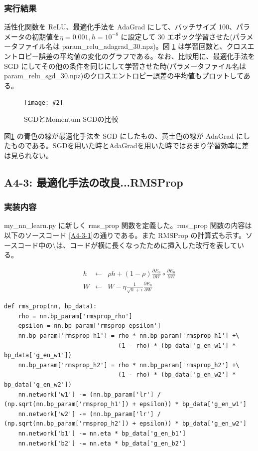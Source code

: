 \documentclass[a4paper,dvipdfmx]{jsarticle}
\newcommand{\image}[3]{
    \begin{figure}[H]
        \begin{center}
        \texttt{[image: \#2]}
        \end{center}
        \caption{#1}
        \label{#3}
    \end{figure}
}
\begin{document}
\subsubsection*{実行結果}

活性化関数を ReLU、最適化手法を AdaGrad にして、バッチサイズ 100、パラメータの初期値を$\eta = 0.001, h = 10^{-8}$ に設定して 30 エポック学習させた(パラメータファイル名は param\_relu\_adagrad\_30.npz)。図 \ref{fig-A4-2-1} は学習回数と、クロスエントロピー誤差の平均値の変化のグラフである。なお、比較用に、最適化手法を SGD にしてその他の条件を同じにして学習させた時(パラメータファイル名は param\_relu\_sgd\_30.npz)のクロスエントロピー誤差の平均値もプロットしてある。

\image{SGDとMomentum SGDの比較}{report_a4-2.png}{fig-A4-2-1}

図\ref{fig-A4-2-1} の青色の線が最適化手法を SGD にしたもの、黄土色の線が AdaGrad にしたものである。SGDを用いた時とAdaGradを用いた時ではあまり学習効率に差は見られない。

\subsection*{A4-3: 最適化手法の改良...RMSProp}

\subsubsection*{実装内容}
my\_nn\_learn.py に新しく rms\_prop 関数を定義した。rms\_prop 関数の内容は以下のソースコード \ref{A4-3-1}の通りである。また RMSProp の計算式も示す。ソースコード中の\textbackslash は、コードが横に長くなったために挿入した改行を表している。

 \begin{eqnarray}
  \label{rmsprop1}
 h & \leftarrow & \rho h + (1-\rho)\frac{\partial E_n}{\partial W} \circ \frac{\partial E_n}{\partial W} \\
 \label{rmsprop2}
 W & \leftarrow & W - \eta \frac{1}{\sqrt{h} + \epsilon} \frac{\partial E_n}{\partial W}
 \end{eqnarray}
\begin{lstlisting}[caption="RMSProp",label=A4-3-1]
def rms_prop(nn, bp_data):
    rho = nn.bp_param['rmsprop_rho']
    epsilon = nn.bp_param['rmsprop_epsilon']
    nn.bp_param['rmsprop_h1'] = rho * nn.bp_param['rmsprop_h1'] +\
                                (1 - rho) * (bp_data['g_en_w1'] * bp_data['g_en_w1'])
    nn.bp_param['rmsprop_h2'] = rho * nn.bp_param['rmsprop_h2'] +\
                                (1 - rho) * (bp_data['g_en_w2'] * bp_data['g_en_w2'])
    nn.network['w1'] -= (nn.bp_param['lr'] / (np.sqrt(nn.bp_param['rmsprop_h1']) + epsilon)) * bp_data['g_en_w1']
    nn.network['w2'] -= (nn.bp_param['lr'] / (np.sqrt(nn.bp_param['rmsprop_h2']) + epsilon)) * bp_data['g_en_w2']
    nn.network['b1'] -= nn.eta * bp_data['g_en_b1']
    nn.network['b2'] -= nn.eta * bp_data['g_en_b2']
\end{lstlisting}
\end{document}

